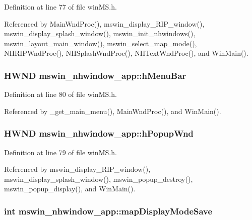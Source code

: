 Definition at line 77 of file win\+M\+S.\+h.



Referenced by Main\+Wnd\+Proc(), mswin\+\_\+display\+\_\+\+R\+I\+P\+\_\+window(), mswin\+\_\+display\+\_\+splash\+\_\+window(), mswin\+\_\+init\+\_\+nhwindows(), mswin\+\_\+layout\+\_\+main\+\_\+window(), mswin\+\_\+select\+\_\+map\+\_\+mode(), N\+H\+R\+I\+P\+Wnd\+Proc(), N\+H\+Splash\+Wnd\+Proc(), N\+H\+Text\+Wnd\+Proc(), and Win\+Main().

\hypertarget{structmswin__nhwindow__app_a975394932faf736ccaa592f525d66bc8}{
\subsubsection[{h\+Menu\+Bar}]{\setlength{\rightskip}{0pt plus 5cm}H\+W\+N\+D mswin\+\_\+nhwindow\+\_\+app\+::h\+Menu\+Bar}}\label{structmswin__nhwindow__app_a975394932faf736ccaa592f525d66bc8}


Definition at line 80 of file win\+M\+S.\+h.



Referenced by \+\_\+get\+\_\+main\+\_\+menu(), Main\+Wnd\+Proc(), and Win\+Main().

\hypertarget{structmswin__nhwindow__app_a92e7b581dd0fad9d1af8364e5bcfe395}{
\subsubsection[{h\+Popup\+Wnd}]{\setlength{\rightskip}{0pt plus 5cm}H\+W\+N\+D mswin\+\_\+nhwindow\+\_\+app\+::h\+Popup\+Wnd}}\label{structmswin__nhwindow__app_a92e7b581dd0fad9d1af8364e5bcfe395}


Definition at line 79 of file win\+M\+S.\+h.



Referenced by mswin\+\_\+display\+\_\+\+R\+I\+P\+\_\+window(), mswin\+\_\+display\+\_\+splash\+\_\+window(), mswin\+\_\+popup\+\_\+destroy(), mswin\+\_\+popup\+\_\+display(), and Win\+Main().

\hypertarget{structmswin__nhwindow__app_a3b5b16eaa9f892c5911bf6e37b888ea6}{
\subsubsection[{map\+Display\+Mode\+Save}]{\setlength{\rightskip}{0pt plus 5cm}int mswin\+\_\+nhwindow\+\_\+app\+::map\+Display\+Mode\+Save}}\label{structmswin__nhwindow__app_a3b5b16eaa9f892c5911bf6e37b888ea6}


